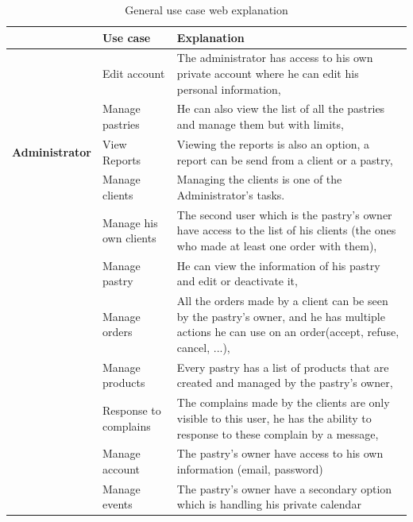 \documentclass[12pt,a4paper]{report}
\begin{document}
		\begin{table}[H]
			\begin{center}
				\caption{\label{user-case-web-explanation} General use case web explanation} 
				\captionsetup[table]{skip=10pt}
				\setlength\doublerulesep{0.5pt}
				\begin{tabular}{|l|p{5cm}|p{8cm}| } 
					\hline\hline
					\rowcolor{LightCyan}
					& \textbf{Use case} & \textbf{Explanation}                                                                                 \\
					\hline
					\hline
					\multirow{5}{*}{\textbf{Administrator} }
					
					& Edit account & The administrator has access to his own private account where he can edit his personal information,          \\
					\cline{2-3}
					& Manage pastries  & He can also view the list of all the pastries and manage them but with limits, \\
					\cline{2-3}
					& View Reports  & Viewing the reports is also an option, a report can be send from a client or a pastry, \\
					\cline{2-3}
					& Manage clients  & Managing the clients is one of the Administrator's tasks. \\
					
					\hline
					\hline
					\multirow{5}{*}{\textbf{Patsy owner} }
					& Manage his own clients & The second user which is the pastry's owner have access to the list of his clients (the ones who made at least one order with them),
					\\
					\cline{2-3}
					& Manage pastry  & He can view the information of his pastry and edit or deactivate it,
					\\
					\cline{2-3}
					& Manage orders  & All the orders made by a client can be seen by the pastry's owner, and he has multiple actions he can use on an order(accept, refuse, cancel, ...),
					\\
					\cline{2-3}
					& Manage products  & Every pastry has a list of products that are created and managed by the pastry's owner, 
					\\
					\cline{2-3}
					& Response to complains  & The complains made by the clients are only visible to this user, he has the ability to response to these complain by a message, 
					\\
					\cline{2-3}
					& Manage account  & The pastry's owner have access to his own information (email, password)\\
					\cline{2-3}
					& Manage events  & The pastry's owner have a secondary option which is handling his private calendar\\
					\hline
				\end{tabular}
			\end{center}
			
		
			\end{table}
\end{document}
